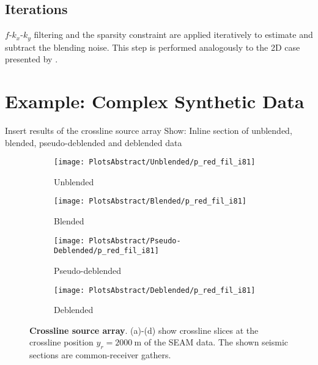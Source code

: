 \documentclass{madrid15WS}
\begin{document}
\subsection{Iterations}

$f$-$k_x$-$k_y$ filtering and the sparsity constraint are applied iteratively to estimate and subtract the blending noise. This step is performed analogously to the 2D case presented by \citet{Mahdad-Deblending-Method}.


\section{Example: Complex Synthetic Data}

Insert results of the crossline source array
Show: Inline section of unblended, blended, pseudo-deblended and deblended data

\begin{figure}[h!]
	\centering
	\begin{subfigure}[t]{0.2\textwidth}
		\centering
		\texttt{[image: PlotsAbstract/Unblended/p\_red\_fil\_i81]}
		\caption{Unblended}
		\label{fig:Example-Unblendedx}
	\end{subfigure}
	\centering
	\begin{subfigure}[t]{0.11286\textwidth}
		\centering
		\texttt{[image: PlotsAbstract/Blended/p\_red\_fil\_i81]}
		\caption{Blended}
		\label{fig:Example-Blendedx}
	\end{subfigure}
	\centering
	\begin{subfigure}[t]{0.2\textwidth}
		\centering
		\texttt{[image: PlotsAbstract/Pseudo-Deblended/p\_red\_fil\_i81]} %
		\caption{Pseudo-deblended}
		\label{fig:Example-Pseudox}
	\end{subfigure}
	\centering
	\begin{subfigure}[t]{0.2\textwidth}
		\centering
		\texttt{[image: PlotsAbstract/Deblended/p\_red\_fil\_i81]} %
		\caption{Deblended}
		\label{fig:Example-Deblendedx}
	\end{subfigure}
		
	\caption{\textbf{Crossline source array}. (a)-(d) show crossline slices at the crossline position $y_r = \SI{2000}{\metre}$ of the SEAM data. The shown seismic sections are common-receiver gathers.}
	\label{fig:Example-Inline-Slices}

\end{figure}
\end{document}
